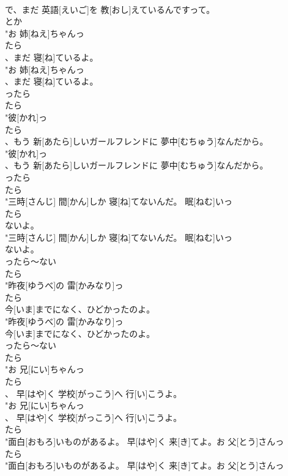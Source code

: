 \documentclass[8pt]{extreport}
\begin{document}
\begin{CJK}{UTF8}{min}
\\	で、まだ 英語[えいご]を 教[おし]えているんですって。
\\	とか
\\	"お 姉[ねえ]ちゃんっ
\\	たら
\\	、まだ 寝[ね]ているよ。
\\	"お 姉[ねえ]ちゃんっ
\\	、まだ 寝[ね]ているよ。
\\	ったら	
\\	たら
\\	"彼[かれ]っ
\\	たら
\\	、もう 新[あたら]しいガールフレンドに 夢中[むちゅう]なんだから。
\\	"彼[かれ]っ
\\	、もう 新[あたら]しいガールフレンドに 夢中[むちゅう]なんだから。
\\	ったら	
\\	たら
\\	"三時[さんじ] 間[かん]しか 寝[ね]てないんだ。 眠[ねむ]いっ
\\	たら
\\	ないよ。
\\	"三時[さんじ] 間[かん]しか 寝[ね]てないんだ。 眠[ねむ]いっ
\\	ないよ。
\\	ったら～ない	
\\	たら
\\	"昨夜[ゆうべ]の 雷[かみなり]っ
\\	たら
\\	今[いま]までになく、ひどかったのよ。
\\	"昨夜[ゆうべ]の 雷[かみなり]っ
\\	今[いま]までになく、ひどかったのよ。
\\	ったら～ない	
\\	たら
\\	"お 兄[にい]ちゃんっ
\\	たら
\\	、 早[はや]く 学校[がっこう]へ 行[い]こうよ。
\\	"お 兄[にい]ちゃんっ
\\	、 早[はや]く 学校[がっこう]へ 行[い]こうよ。
\\	たら
\\	"面白[おもろ]いものがあるよ。 早[はや]く 来[き]てよ。お 父[とう]さんっ
\\	たら
\\	"面白[おもろ]いものがあるよ。 早[はや]く 来[き]てよ。お 父[とう]さんっ

\end{CJK}
\end{document}
